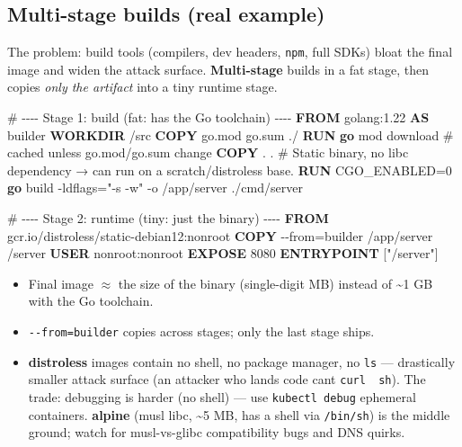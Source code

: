\documentclass[11pt]{article}
\providecommand{\tightlist}{\setlength{\itemsep}{1pt}\setlength{\parskip}{0pt}}
\newenvironment{Shaded}{\begin{snugshade}}{\end{snugshade}}
\newcommand{\AttributeTok}[1]{\textcolor[rgb]{0.16,0.50,0.73}{#1}}
\newcommand{\CommentTok}[1]{\textcolor[rgb]{0.48,0.49,0.49}{#1}}
\newcommand{\ExtensionTok}[1]{\textcolor[rgb]{0.00,0.60,1.00}{\textbf{#1}}}
\newcommand{\KeywordTok}[1]{\textcolor[rgb]{0.81,0.81,0.76}{\textbf{#1}}}
\newcommand{\NormalTok}[1]{\textcolor[rgb]{0.81,0.81,0.76}{#1}}
\newcommand{\OperatorTok}[1]{\textcolor[rgb]{0.81,0.81,0.76}{#1}}
\newcommand{\StringTok}[1]{\textcolor[rgb]{0.96,0.31,0.31}{#1}}
\newcommand{\VariableTok}[1]{\textcolor[rgb]{0.15,0.68,0.68}{#1}}
\begin{document}
\subsection{Multi-stage builds (real example)}\label{multi-stage-builds-real-example}

The problem: build tools (compilers, dev headers, \texttt{npm}, full SDKs) bloat the final image and widen the attack surface. \textbf{Multi-stage} builds in a fat stage, then copies \emph{only the artifact} into a tiny runtime stage.


\begin{Shaded}
\begin{Highlighting}[]
\CommentTok{\# {-}{-}{-}{-} Stage 1: build (fat: has the Go toolchain) {-}{-}{-}{-}}
\KeywordTok{FROM}\NormalTok{ golang:1.22 }\KeywordTok{AS}\NormalTok{ builder}
\KeywordTok{WORKDIR}\NormalTok{ /src}
\KeywordTok{COPY}\NormalTok{ go.mod go.sum ./}
\KeywordTok{RUN} \ExtensionTok{go}\NormalTok{ mod download                 }\CommentTok{\# cached unless go.mod/go.sum change}
\KeywordTok{COPY}\NormalTok{ . .}
\CommentTok{\# Static binary, no libc dependency → can run on a scratch/distroless base.}
\KeywordTok{RUN} \VariableTok{CGO\_ENABLED}\OperatorTok{=}\NormalTok{0 }\ExtensionTok{go}\NormalTok{ build }\AttributeTok{{-}ldflags}\OperatorTok{=}\StringTok{"{-}s {-}w"} \AttributeTok{{-}o}\NormalTok{ /app/server ./cmd/server}

\CommentTok{\# {-}{-}{-}{-} Stage 2: runtime (tiny: just the binary) {-}{-}{-}{-}}
\KeywordTok{FROM}\NormalTok{ gcr.io/distroless/static{-}debian12:nonroot}
\KeywordTok{COPY} \OperatorTok{{-}{-}from=builder}\NormalTok{ /app/server /server}
\KeywordTok{USER}\NormalTok{ nonroot:nonroot}
\KeywordTok{EXPOSE}\NormalTok{ 8080}
\KeywordTok{ENTRYPOINT}\NormalTok{ [}\StringTok{"/server"}\NormalTok{]}
\end{Highlighting}
\end{Shaded}

\begin{itemize}
\tightlist
\item
  Final image \(\approx\) the size of the binary (single-digit MB) instead of \textasciitilde1 GB with the Go toolchain.
\item
  \texttt{-\/-from=builder} copies across stages; only the last stage ships.
\item
  \textbf{distroless} images contain no shell, no package manager, no \texttt{ls} --- drastically smaller attack surface (an attacker who lands code can\textquotesingle t \texttt{curl\ \textbar{}\ sh}). The trade: debugging is harder (no shell) --- use \texttt{kubectl\ debug} ephemeral containers. \textbf{alpine} (musl libc, \textasciitilde5 MB, has a shell via \texttt{/bin/sh}) is the middle ground; watch for musl-vs-glibc compatibility bugs and DNS quirks.
\end{itemize}
\end{document}
